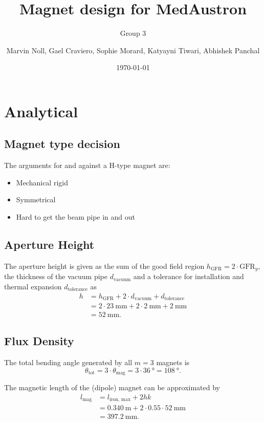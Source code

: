 \documentclass[10pt,a4paper,noendnumber=true]{scrartcl}
\title{Magnet design for MedAustron}
\subtitle{Group 3}
\author{Marvin Noll, Gael Craviero, Sophie Morard, Katyayni Tiwari, Abhishek Panchal}
\date{\today}
\newcommand\pro{\item[$+$]}
\newcommand\con{\item[$-$]}
\begin{document}
\maketitle

\section{Analytical}
\subsection{Magnet type decision}
The arguments for and against a H-type magnet are:
\begin{itemize}
\pro Mechanical rigid
\pro Symmetrical
\con Hard to get the beam pipe in and out
\end{itemize}

\subsection{Aperture Height}
The aperture height is given as the sum of the good field region $h_\text{GFR} = 2\cdot \text{GFR}_y$, the thickness of the vacuum pipe $d_\text{vacuum}$ and a tolerance for installation and thermal expansion $d_\text{tolerance}$ as
\begin{align}
    h &= h_\text{GFR} + 2\cdot d_\text{vacuum} + d_\text{tolerance} \\
      &= 2\cdot\SI{23}{\mm} + 2\cdot \SI{2}{\mm} + \SI{2}{\mm}\nonumber\\ 
      &= \SI{52}{\mm}. \nonumber
\end{align}

\subsection{Flux Density}
The total bending angle generated by all $m=3$ magnets is
\begin{equation}
    \theta_\text{tot} = 3 \cdot \theta_\text{mag} = 3 \cdot \SI{36}{\degree} = \SI{108}{\degree}.
\end{equation}

The magnetic length of the (dipole) magnet can be approximated by
\begin{align}
    l_\text{mag} &= l_\text{iron, max} + 2hk \\
    &= \SI{0.340}{\meter} + 2\cdot 0.55 \cdot \SI{52}{\mm}\nonumber\\
    &= \SI{397.2}{\mm}.\nonumber
\end{align}
\end{document}
